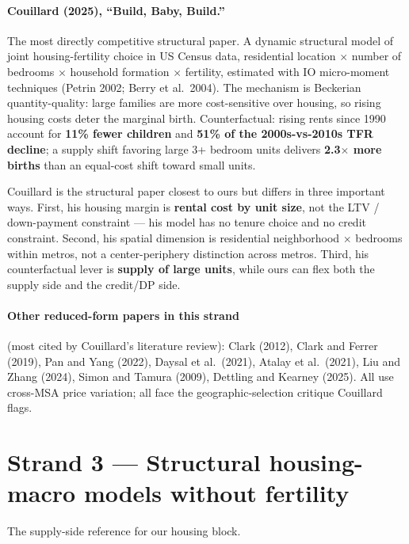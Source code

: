 \documentclass[11pt]{article}
\begin{document}
\paragraph{Couillard (2025), ``Build, Baby, Build.''}
The most directly competitive structural paper. A dynamic structural model of joint housing-fertility choice in US Census data, residential location $\times$ number of bedrooms $\times$ household formation $\times$ fertility, estimated with IO micro-moment techniques (Petrin 2002; Berry et al.\ 2004). The mechanism is Beckerian quantity-quality: large families are more cost-sensitive over housing, so rising housing costs deter the marginal birth. Counterfactual: rising rents since 1990 account for \textbf{11\% fewer children} and \textbf{51\% of the 2000s-vs-2010s TFR decline}; a supply shift favoring large 3+ bedroom units delivers \textbf{2.3$\times$ more births} than an equal-cost shift toward small units.

Couillard is the structural paper closest to ours but differs in three important ways. First, his housing margin is \textbf{rental cost by unit size}, not the LTV / down-payment constraint --- his model has no tenure choice and no credit constraint. Second, his spatial dimension is residential neighborhood $\times$ bedrooms within metros, not a center-periphery distinction across metros. Third, his counterfactual lever is \textbf{supply of large units}, while ours can flex both the supply side and the credit/DP side.

\paragraph{Other reduced-form papers in this strand} (most cited by Couillard's literature review): Clark (2012), Clark and Ferrer (2019), Pan and Yang (2022), Daysal et al.\ (2021), Atalay et al.\ (2021), Liu and Zhang (2024), Simon and Tamura (2009), Dettling and Kearney (2025). All use cross-MSA price variation; all face the geographic-selection critique Couillard flags.

\section{Strand 3 --- Structural housing-macro models without fertility}

The supply-side reference for our housing block.
\end{document}
